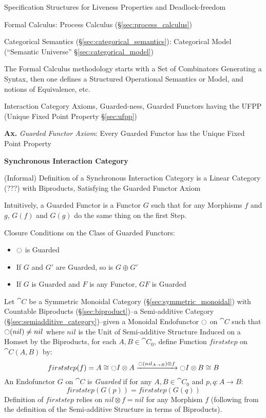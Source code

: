 Specification Structures for Liveness Properties and Deadlock-freedom

Formal Calculus: Process Calculus (\S\ref{sec:process_calculus})

Categorical Semantics (\S\ref{sec:categorical_semantics}): Categorical
Model (``Semantic Universe'' \S\ref{sec:categorical_model})

The Formal Calculus methodology starts with a Set of Combinators
Generating a Syntax, then one defines a Structured Operational
Semantics or Model, and notions of Equivalence, etc.

Interaction Category Axioms, Guarded-ness, Guarded Functors having the
UFPP (Unique Fixed Point Property \S\ref{sec:ufpp}) %

\textbf{Ax.} \emph{Guarded Functor Axiom}: Every Guarded Functor has
the Unique Fixed Point Property


\textbf{Synchronous Interaction Category}

(Informal) Definition of a Synchronous Interaction Category is a
Linear Category (???) with Biproducts, Satisfying the Guarded Functor
Axiom

Intuitively, a Guarded Functor is a Functor $G$ such that for any
Morphisms $f$ and $g$, $G(f)$ and $G(g)$ do the same thing on the
first Step.

Closure Conditions on the Class of Guarded Functors:
\begin{itemize}
  \item $\ocircle$ is Guarded
  \item If $G$ and $G'$ are Guarded, so is $G \oplus G'$
  \item If $G$ is Guarded and $F$ is any Functor, $G F$ is Guarded
\end{itemize}

Let $\cat{C}$ be a Symmetric Monoidal Category
(\S\ref{sec:symmetric_monoidal}) with Countable Biproducts
(\S\ref{sec:biproduct})--a Semi-additive Category
(\S\ref{sec:semiadditive_category})--given a Monoidal Endofunctor $\ocircle$
on $\cat{C}$ such that $\ocircle(nil) \neq nil$ where $nil$ is the
Unit of Semi-additive Structure Induced on a Homset by the Biproducts,
for each $A,B \in \cat{C}_0$, define Function $firststep$ on
$\cat{C}(A,B)$ by:
\[
  firststep(f) = A \cong \ocircle I \otimes A
    \xrightarrow{\ocircle(nil_{A \rightarrow B}) \otimes f}
    \ocircle I \otimes B \cong B
\]
An Endofunctor $G$ on $\cat{C}$ is \emph{Guarded} if for any $A,B \in
\cat{C}_0$ and $p,q : A \rightarrow B$:
\[
  firststep(G(p)) = firststep(G(q))
\]
Definition of $firststep$ relies on $nil \otimes f = nil$ for any
Morphism $f$ (following from the definition of the Semi-additive
Structure in terms of Biproducts).

